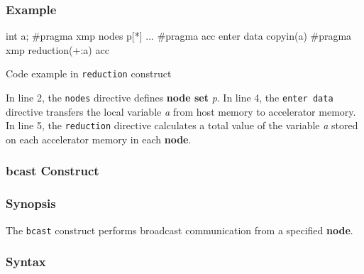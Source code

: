 \subsubsection*{Example}
\begin{myfigure}
\begin{minipage}{0.45\hsize}
\begin{center}
\end{center}
\end{minipage}
%
\begin{minipage}{0.53\hsize}
\begin{center}
\begin{XACCCexampleR}
int a;
#pragma xmp nodes p[*]
...
#pragma acc enter data copyin(a)
#pragma xmp reduction(+:a) acc
\end{XACCCexampleR}
\end{center}
\end{minipage}
\caption{Code example in {\tt reduction} construct}\label{code:reduction}
\end{myfigure}

In line 2,
the {\tt nodes} directive defines {\bf node set} {\it p}.
In line 4,
the {\tt enter data} directive transfers the local variable {\it a} from host memory to accelerator memory.
In line 5,
the {\tt reduction} directive calculates a total value of the variable {\it a} stored on each accelerator
memory in each {\bf node}.

\subsubsection{bcast Construct}\label{sec:bcast}
\subsubsection*{Synopsis}
The {\tt bcast} construct performs broadcast communication from a specified {\bf node}.

\subsubsection*{Syntax}

